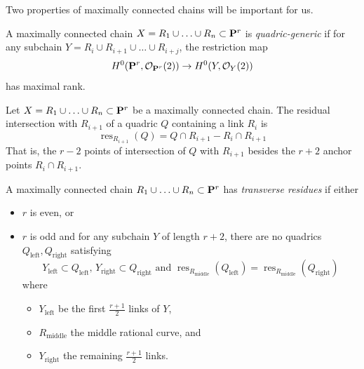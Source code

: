 \documentclass[11pt, two side, letterpaper, final]{amsart}
\renewcommand{\P}{{\bf P}}
\begin{document}
Two properties of maximally connected chains will be important for us.

\begin{definition}
A maximally connected chain $X = R_1\cup \ldots \cup R_n \subset \P^r$ is \emph{quadric-generic} if for any subchain
$Y=R_i \cup R_{i+1} \cup \ldots \cup R_{i+j}$, the restriction map 
\[
	H^0(\P^r, \sh{O}_{\P^r}(2)) \to H^0(Y,\sh{O}_Y(2))
\]
has maximal rank.
\end{definition}
\begin{definition}
Let $X=R_1 \cup \ldots \cup R_n \subset \P^r$ be a maximally connected chain. The residual intersection with $R_{i+1}$
of a quadric $Q$ containing a link $R_i$ is
\[
	\operatorname{res}_{R_{i+1}}(Q)= Q \cap R_{i+1} - R_i \cap R_{i+1}
\]
That is, the $r-2$ points of intersection of $Q$ with $R_{i+1}$ besides the $r+2$ anchor points $R_i \cap R_{i+1}$.
\end{definition}

\begin{definition} \label{definition:transverse-residues}
 A maximally connected chain $R_1 \cup \ldots \cup R_n \subset \P^r$ has \emph{transverse residues}
if either
\begin{itemize}
\item $r$ is even, or
\item $r$ is odd and
	for any subchain $Y$ of length $r+2$, 
	there are no quadrics $Q_\text{left}, Q_\text{right}$ satisfying 
	\[
		Y_\text{left} \subset Q_\text{left}, \, Y_\text{right} \subset Q_\text{right} \text{ and }\operatorname{res}_{R_\text{middle}}(Q_\text{left}) = \operatorname{res}_{R_\text{middle}}(Q_\text{right})
	\]
	where 
	\begin{itemize}
		\item $Y_\text{left}$ be the first $\frac{r+1}{2}$ links of $Y$,
		\item $R_\text{middle}$ the middle rational curve, and 
		\item $Y_\text{right}$ the remaining $\frac{r+1}{2}$ links.
	\end{itemize}
	
\end{itemize}
\end{definition}
\end{document}
